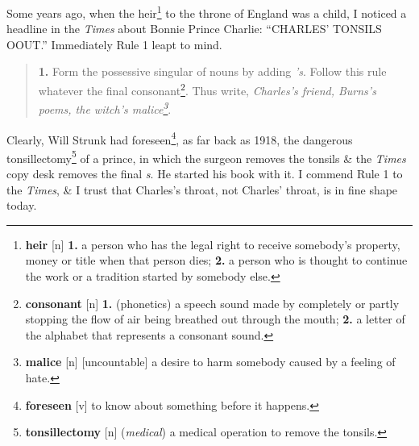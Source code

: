 \documentclass{article}
\begin{document}
Some years ago, when the heir\footnote{{\bf heir} [n] {\bf 1.} a person who has the legal right to receive somebody's property, money or title when that person dies; {\bf 2.} a person who is thought to continue the work or a tradition started by somebody else.} to the throne of England was a child, I noticed a headline in the {\it Times} about Bonnie Prince Charlie: ``CHARLES' TONSILS OOUT.'' Immediately Rule 1 leapt to mind.
\begin{quotation}
	{\bf 1.} Form the possessive singular of nouns by adding {\it 's}. Follow this rule whatever the final consonant\footnote{{\bf consonant} [n] {\bf 1.} (phonetics) a speech sound made by completely or partly stopping the flow of air being breathed out through the mouth; {\bf 2.} a letter of the alphabet that represents a consonant sound.}. Thus write, {\it Charles's friend, Burns's poems, the witch's malice\footnote{{\bf malice} [n] [uncountable] a desire to harm somebody caused by a feeling of hate.}}.
\end{quotation}
Clearly, Will Strunk had foreseen\footnote{{\bf foreseen} [v] to know about something before it happens.}, as far back as 1918, the dangerous tonsillectomy\footnote{{\bf tonsillectomy} [n] ({\it medical}) a medical operation to remove the tonsils.} of a prince, in which the surgeon removes the tonsils \& the {\it Times} copy desk removes the final {\it s}. He started his book with it. I commend Rule 1 to the {\it Times}, \& I trust that Charles's throat, not Charles' throat, is in fine shape today.
\end{document}
